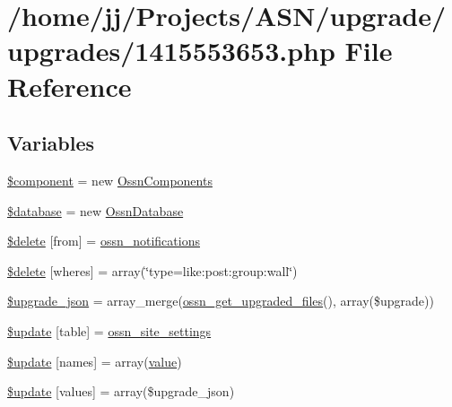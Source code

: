 \hypertarget{1415553653_8php}{}\section{/home/jj/\+Projects/\+A\+S\+N/upgrade/upgrades/1415553653.php File Reference}
\label{1415553653_8php}
\subsection*{Variables}
\begin{DoxyCompactItemize}
\item 
\hyperlink{1415553653_8php_a211527c21ba56109545060b49b628e59}{\$component} = new \hyperlink{class_ossn_components}{Ossn\+Components}
\item 
\hyperlink{1415553653_8php_a7691c0162d89de0b6ba47edcd8ba8878}{\$database} = new \hyperlink{class_ossn_database}{Ossn\+Database}
\item 
\hyperlink{1415553653_8php_ac228c31a229875fce5416792b17c9eee}{\$delete} \mbox{[}\textquotesingle{}from\textquotesingle{}\mbox{]} = \textquotesingle{}\hyperlink{_ossn_notifications_2ossn__com_8php_ab2b4e6857fa4ab775e70e28fa8daa4e8}{ossn\+\_\+notifications}\textquotesingle{}
\item 
\hyperlink{1415553653_8php_a9bef9b9c519ccfae44ff986580419667}{\$delete} \mbox{[}\textquotesingle{}wheres\textquotesingle{}\mbox{]} = array(\char`\"{}type=\textquotesingle{}like\+:post\+:group\+:wall\textquotesingle{}\char`\"{})
\item 
\hyperlink{1415553653_8php_a512525d0f5eb608ac72ca7b85e5fbf65}{\$upgrade\+\_\+json} = array\+\_\+merge(\hyperlink{ossn_8lib_8upgrade_8php_a984d0f1ee4273d739939d28d00a8bedb}{ossn\+\_\+get\+\_\+upgraded\+\_\+files}(), array(\$upgrade))
\item 
\hyperlink{1415553653_8php_aee7ba5985ddf023a93862ab77e9718f9}{\$update} \mbox{[}\textquotesingle{}table\textquotesingle{}\mbox{]} = \textquotesingle{}\hyperlink{ossn_8lib_8system_8php_a610e2045b8a86c09f777b4d82e24e34c}{ossn\+\_\+site\+\_\+settings}\textquotesingle{}
\item 
\hyperlink{1415553653_8php_abcf5ad2e4fef35de04bef0168cc91ddc}{\$update} \mbox{[}\textquotesingle{}names\textquotesingle{}\mbox{]} = array(\textquotesingle{}\hyperlink{fullpage_2plugin_8min_8js_ac56c57897e10f699d124e0103921aa20}{value}\textquotesingle{})
\item 
\hyperlink{1415553653_8php_ac82a75b4c6df37380ff77c88f041785e}{\$update} \mbox{[}\textquotesingle{}values\textquotesingle{}\mbox{]} = array(\$upgrade\+\_\+json)

\end{DoxyCompactItemize}
